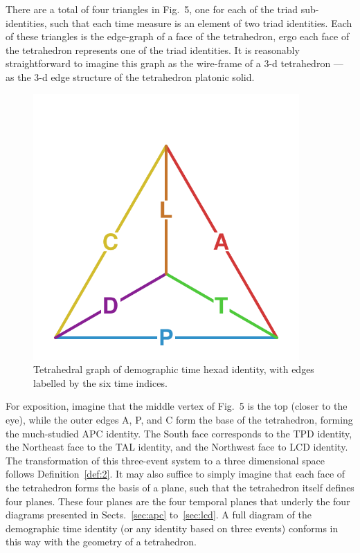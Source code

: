 \documentclass{bmcart}
\theoremstyle{definition}
\begin{document}
There are a total of four triangles in Fig.~5, one for each
of the triad sub-identities, such that each time measure is an element of two
triad identities. Each of these triangles is the
edge-graph of a face of the tetrahedron, ergo each face of the tetrahedron
represents one of the triad identities. It is reasonably straightforward to
imagine this graph as the wire-frame of a 3-d
tetrahedron --- as the 3-d edge structure of the tetrahedron platonic solid.

\begin{figure}[h!]
\centering
\caption{Tetrahedral graph of demographic time hexad identity, with edges
labelled by the six time indices.}
\label{fig:tet}
\includegraphics[width=4in]{Fig5.pdf}%
\end{figure}

For exposition, imagine that the middle vertex of Fig.~5 is the
top (closer to the eye), while the outer edges A, P, and C form the
base of the tetrahedron, forming the much-studied APC identity.
The South face corresponds to the TPD identity,
the Northeast face to the TAL identity, and the
Northwest face to LCD identity. The transformation of this three-event
system to a three dimensional space follows Definition~\ref{def:2}.
It may also suffice to simply imagine that each face of the tetrahedron forms
the basis of a plane, such that the tetrahedron itself defines four planes. These four planes are the four temporal planes that underly
the four diagrams presented in Sects.~\ref{sec:apc} to~\ref{sec:lcd}. A full
diagram of the demographic time identity (or any identity based on three events)
conforms in this way with the geometry of a tetrahedron.
\end{document}
